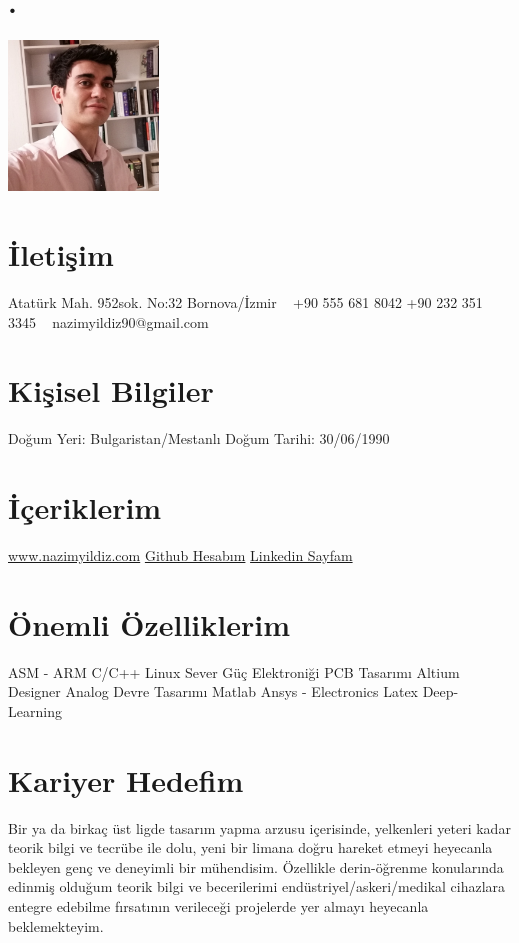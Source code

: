 \documentclass[]{cv-style} %
\begin{document}
\begin{aside}
\section{.}
\includegraphics[width=4cm]{photo.jpg}
\section{İletişim}
Atatürk Mah.
952sok. No:32
Bornova/İzmir
~
+90 555 681 8042
+90 232 351 3345
~
nazimyildiz90@gmail.com
\section{Kişisel Bilgiler}
Doğum Yeri: Bulgaristan/Mestanlı
\hspace{0.2mm}
Doğum Tarihi: 30/06/1990
\section{İçeriklerim}
\href{www.nazimyildiz.com}{www.nazimyildiz.com}
\href{https://github.com/namcho}{Github Hesabım}
\href{https://www.linkedin.com/in/naz%C4%B1m-y%C4%B1ld%C4%B1z-a67b0344/}{Linkedin Sayfam}
\section{Önemli Özelliklerim}
ASM - ARM
C/C++
Linux Sever
Güç Elektroniği
PCB Tasarımı
Altium Designer
Analog Devre Tasarımı
Matlab
Ansys - Electronics
Latex
Deep-Learning
\end{aside}
\section{Kariyer Hedefim}
  \vspace{-0.2cm}
Bir ya da birkaç üst ligde tasarım yapma arzusu içerisinde, yelkenleri yeteri kadar teorik bilgi ve tecrübe ile dolu, yeni bir limana doğru hareket etmeyi heyecanla bekleyen genç ve deneyimli bir mühendisim. Özellikle derin-öğrenme konularında edinmiş olduğum teorik bilgi ve becerilerimi endüstriyel/askeri/medikal cihazlara entegre edebilme fırsatının verileceği projelerde yer almayı heyecanla beklemekteyim.
\end{document}
